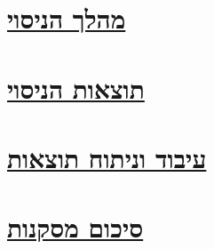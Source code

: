 \documentclass[a4paper, 12pt]{article}
\begin{document}
    \pagebreak 

    \section{\underline{מהלך הניסוי}}
    \begin{spacing}{1.15}
        \begin{flushright}

        \end{flushright}
    \end{spacing}

    \pagebreak 

    \section{\underline{תוצאות הניסוי}}
    \begin{spacing}{1.15}
        \begin{flushright}

        \end{flushright}
    \end{spacing}

    \pagebreak 

    \section{\underline{עיבוד וניתוח תוצאות}}
    \begin{spacing}{1.15}
        \begin{flushright}

        \end{flushright}
    \end{spacing}

    \pagebreak 

    \section{\underline{סיכום מסקנות}}
    \begin{spacing}{1.15}
        \begin{flushright}

        \end{flushright}
    \end{spacing}
\end{document}
